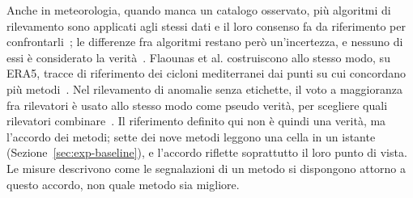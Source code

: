 Anche in meteorologia, quando manca un catalogo osservato, più algoritmi di rilevamento sono applicati agli stessi dati e il loro consenso fa da riferimento per confrontarli~\cite{lora2020consensus}; le differenze fra algoritmi restano però un'incertezza, e nessuno di essi è considerato la verità~\cite{shields2018artmip,neu2013imilast}. Flaounas et al. costruiscono allo stesso modo, su ERA5, tracce di riferimento dei cicloni mediterranei dai punti su cui concordano più metodi~\cite{flaounas2023composite}. Nel rilevamento di anomalie senza etichette, il voto a maggioranza fra rilevatori è usato allo stesso modo come pseudo verità, per scegliere quali rilevatori combinare~\cite{rayana2016selective}. Il riferimento definito qui non è quindi una verità, ma l'accordo dei metodi; sette dei nove metodi leggono una cella in un istante (Sezione~\ref{sec:exp-baseline}), e l'accordo riflette soprattutto il loro punto di vista. Le misure descrivono come le segnalazioni di un metodo si dispongono attorno a questo accordo, non quale metodo sia migliore.

